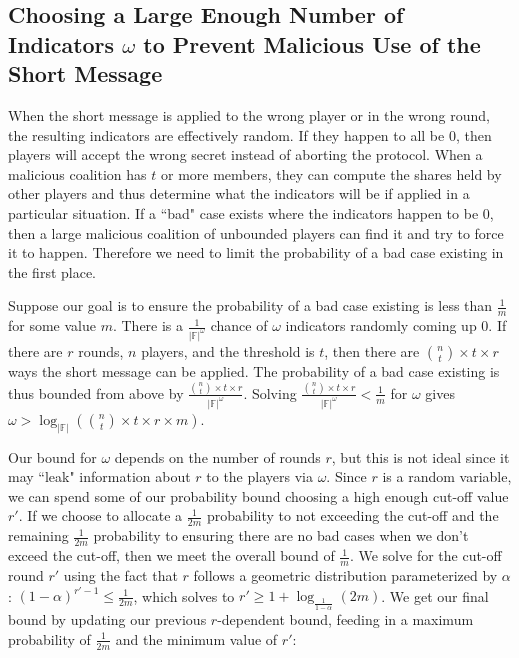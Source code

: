 \documentclass[12pt]{dalcsthesis}
\begin{document}
\subsection{Choosing a Large Enough Number of Indicators $\omega$ to Prevent Malicious Use of the Short Message}
\label{Sec:SUIP:MinIndicators}

When the short message is applied to the wrong player or in the wrong round, the resulting indicators are effectively random. If they happen to all be 0, then players will accept the wrong secret instead of aborting the protocol. When a malicious coalition has $t$ or more members, they can compute the shares held by other players and thus determine what the indicators will be if applied in a particular situation. If a ``bad" case exists where the indicators happen to be 0, then a large malicious coalition of unbounded players can find it and try to force it to happen. Therefore we need to limit the probability of a bad case existing in the first place. 

Suppose our goal is to ensure the probability of a bad case existing is less than $\frac{1}{m}$ for some value $m$. There is a $\frac{1}{|\mathbb{F}|^\omega}$ chance of $\omega$ indicators randomly coming up 0. If there are $r$ rounds, $n$ players, and the threshold is $t$, then there are $\binom{n}{t} \times t \times r$ ways the short message can be applied. The probability of a bad case existing is thus bounded from above by $\frac{\binom{n}{t} \times t \times r}{|\mathbb{F}|^\omega}$. Solving $\frac{\binom{n}{t} \times t \times r}{|\mathbb{F}|^\omega} < \frac{1}{m}$ for $\omega$ gives $\omega > \log_{|\mathbb{F}|} (\binom{n}{t} \times t \times r \times m)$.

Our bound for $\omega$ depends on the number of rounds $r$, but this is not ideal since it may ``leak" information about $r$ to the players via $\omega$. Since $r$ is a random variable, we can spend some of our probability bound choosing a high enough cut-off value $r'$. If we choose to allocate a $\frac{1}{2 m}$ probability to not exceeding the cut-off and the remaining $\frac{1}{2 m}$ probability to ensuring there are no bad cases when we don't exceed the cut-off, then we meet the overall bound of $\frac{1}{m}$. We solve for the cut-off round $r'$ using the fact that $r$ follows a geometric distribution parameterized by $\alpha$: $(1 - \alpha)^{r'-1} \leq \frac{1}{2 m}$, which solves to $r' \geq 1 + \log_{\frac{1}{1-\alpha}}(2 m)$. We get our final bound by updating our previous $r$-dependent bound, feeding in a maximum probability of $\frac{1}{2 m}$ and the minimum value of $r'$:
\end{document}
